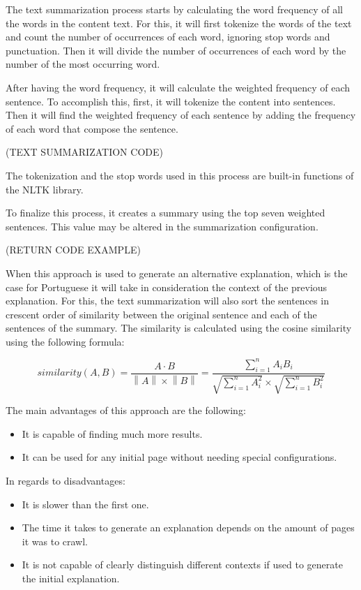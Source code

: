 The text summarization process starts by calculating the word frequency of all the words in the content text.
For this, it will first tokenize the words of the text and count the number of occurrences of each word, ignoring stop words and punctuation.
Then it will divide the number of occurrences of each word by the number of the most occurring word.

After having the word frequency, it will calculate the weighted frequency of each sentence.
To accomplish this, first, it will tokenize the content into sentences.
Then it will find the weighted frequency of each sentence by adding the frequency of each word that compose the sentence.

(TEXT SUMMARIZATION CODE) %

The tokenization and the stop words used in this process are built-in functions of the NLTK library.

To finalize this process, it creates a summary using the top seven weighted sentences.
This value may be altered in the summarization configuration.

(RETURN CODE EXAMPLE) %

When this approach is used to generate an alternative explanation, which is the case for Portuguese it will take in consideration the context of the previous explanation.
For this, the text summarization will also sort the sentences in crescent order of similarity between the original sentence and each of the sentences of the summary.
The similarity is calculated using the cosine similarity using the following formula:

\begin{equation}
    {similarity(A,B)} = \frac{A \cdot B}{\left \| A \right \| \times \left \| B \right \|}= \frac{\sum_{i=1}^{n} A_{i}B_{i}}{\sqrt{\sum_{i=1}^{n} A_{i}^{2}} \times \sqrt{\sum_{i=1}^{n} B_{i}^{2}}}
\label{similarity}
\end{equation}

The main advantages of this approach are the following:
\begin{itemize}
        \item It is capable of finding much more results.
        \item It can be used for any initial page without needing special configurations.
\end{itemize}

In regards to disadvantages:
\begin{itemize}
        \item It is slower than the first one.
        \item The time it takes to generate an explanation depends on the amount of pages it was to crawl.
        \item It is not capable of clearly distinguish different contexts if used to generate the initial explanation.
\end{itemize}

